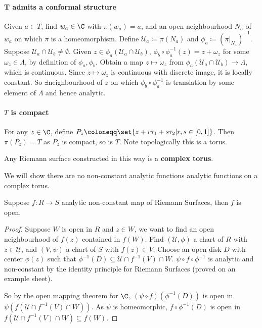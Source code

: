\documentclass{article}
\begin{document}
\paragraph{T admits a conformal structure} Given $a \in T$, find $w_a \in \C$ with $\pi(w_a) = a$, and an open neighbourhood $N_a$ of $w_a$ on which $\pi$ is a homeomorphism. Define $\mathcal{U}_a \coloneqq \pi(N_a)$ and $\phi_a \coloneqq (\pi|_{N_a})^{-1}$.
Suppose $\mathcal{U}_a \cap \mathcal{U}_b \neq \emptyset$.
Given $z \in \phi_a(\mathcal{U}_a \cap \mathcal{U}_b)$, $\phi_b \circ \phi_a^{-1}(z) = z + \omega_z$ for some $\omega_z \in \Lambda$, by definition of $\phi_a, \phi_b$. Obtain a map $z \mapsto \omega_z$ from $\phi_a(\mathcal{U}_a \cap \mathcal{U}_b) \to \Lambda$, which is continuous.
Since $z \mapsto \omega_z$ is continuous with discrete image, it is locally constant. So $\exists$neighbourhood of $z$ on which $\phi_b \circ \phi_a^{-1}$ is translation by some element of $\Lambda$ and hence analytic.

\paragraph{$T$ is compact}
For any $z \in \C$, define $P_z \coloneqq \set{z + r \tau_1 + s \tau_2 | r, s \in [0, 1]}$. Then $\pi(P_z) = T$ as $P_z$ is compact, so is $T$. Note topologically this is a torus.

\begin{defi}
    Any Riemann surface constructed in this way is a \textbf{complex torus}.
\end{defi}

We will show there are no non-constant analytic functions analytic functions on a complex torus.
\begin{thm}
    Suppose $f: R \to S$ analytic non-constant map of Riemann Surfaces, then $f$ is open.
\end{thm}

\begin{proof}
    Suppose $W$ is open in $R$ and $z \in W$, we want to find an open neighbourhood of $f(z)$ contained in $f(W)$. Find $(\mathcal{U}, \phi)$ a chart of $R$ with $z \in \mathcal{U}$, and $(V, \psi)$ a chart of $S$ with $f(z) \in V$.
    Choose an open disk $D$ with center $\phi(z)$ such that $\phi^{-1}(D) \subseteq \mathcal{U} \cap f^{-1}(V) \cap W$.
    $\psi \circ f \circ \phi^{-1}$ is analytic and non-constant by the identity principle for Riemann Surfaces (proved on an example sheet).

    So by the open mapping theorem for $\C$, $(\psi \circ f)(\phi^{-1}(D))$ is open in $\psi(f(\mathcal{U} \cap f^{-1}(V) \cap W))$. As $\psi$ is homeomorphic, $f \circ \phi^{-1}(D)$ is open in $f(\mathcal{U} \cap f^{-1}(V) \cap W) \subseteq f(W)$.
\end{proof}
\end{document}
